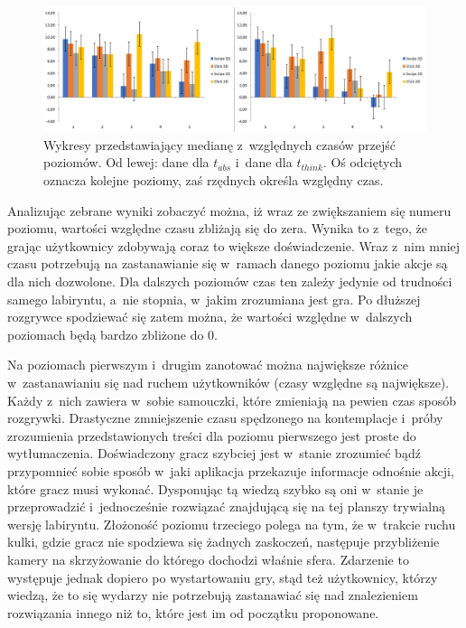 \documentclass[a4paper,12pt,numbers=noenddot]{report}
\begin{document}
\begin{figure}[h!]
	\centering
  	\includegraphics[width=\linewidth]{diag/rel_median_absThinkTime.png}
	\caption{Wykresy przedstawiający medianę z~względnych czasów przejść poziomów. Od lewej: dane dla $t_{abs}$ i~dane dla $t_{think}$. Oś odciętych oznacza kolejne poziomy, zaś rzędnych określa względny czas.}
	\label{fig:diag:rel:median_AbsThinkTime}
\end{figure}

Analizując zebrane wyniki zobaczyć można, iż wraz ze zwiększaniem się numeru poziomu, wartości względne czasu zbliżają się do zera. Wynika to z~tego, że grając użytkownicy zdobywają coraz to większe doświadczenie. Wraz z~nim mniej czasu potrzebują na zastanawianie się w~ramach danego poziomu jakie akcje są dla nich dozwolone. Dla dalszych poziomów czas ten zależy jedynie od trudności samego labiryntu, a~nie stopnia, w~jakim zrozumiana jest gra. Po dłuższej rozgrywce spodziewać się zatem można, że wartości względne w~dalszych poziomach będą bardzo zbliżone do 0.

Na poziomach pierwszym i~drugim zanotować można największe różnice w~zastanawianiu się nad ruchem użytkowników (czasy względne są największe). Każdy z~nich zawiera w~sobie samouczki, które zmieniają na pewien czas sposób rozgrywki. Drastyczne zmniejszenie czasu spędzonego na kontemplacje i~próby zrozumienia przedstawionych treści dla poziomu pierwszego jest proste do wytłumaczenia. Doświadczony gracz szybciej jest w~stanie zrozumieć bądź przypomnieć sobie sposób w~jaki aplikacja przekazuje informacje odnośnie akcji, które gracz musi wykonać. Dysponując tą wiedzą szybko są oni w~stanie je przeprowadzić i~jednocześnie rozwiązać znajdującą się na tej planszy trywialną wersję labiryntu. Złożoność poziomu trzeciego polega na tym, że w~trakcie ruchu kulki, gdzie gracz nie spodziewa się żadnych zaskoczeń, następuje przybliżenie kamery na skrzyżowanie do którego dochodzi właśnie sfera. Zdarzenie to występuje jednak dopiero po wystartowaniu gry, stąd też użytkownicy, którzy wiedzą, że to się wydarzy nie potrzebują zastanawiać się nad znalezieniem rozwiązania innego niż to, które jest im od początku proponowane.\\
\end{document}
